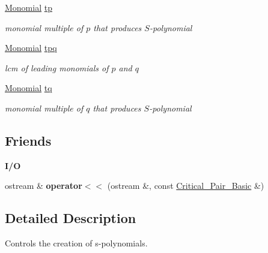 \begin{DoxyCompactItemize}
\mbox{\label{class_critical___pair___basic_a9b232e6359525154a6d7865e607964bb}} 
\hyperlink{class_monomial}{Monomial} \hyperlink{class_critical___pair___basic_a9b232e6359525154a6d7865e607964bb}{tp}
\begin{DoxyCompactList}\small\item\em monomial multiple of $p$ that produces $S$-\/polynomial \end{DoxyCompactList}\item 
\mbox{\label{class_critical___pair___basic_a91d6dc4856d8fb137faf8ffe2b823ae8}} 
\hyperlink{class_monomial}{Monomial} \hyperlink{class_critical___pair___basic_a91d6dc4856d8fb137faf8ffe2b823ae8}{tpq}
\begin{DoxyCompactList}\small\item\em lcm of leading monomials of $p$ and $q$ \end{DoxyCompactList}\item 
\mbox{\label{class_critical___pair___basic_a7e67ffb4af6c13830c95253e464bc3a3}} 
\hyperlink{class_monomial}{Monomial} \hyperlink{class_critical___pair___basic_a7e67ffb4af6c13830c95253e464bc3a3}{tq}
\begin{DoxyCompactList}\small\item\em monomial multiple of $q$ that produces $S$-\/polynomial \end{DoxyCompactList}\end{DoxyCompactItemize}
\subsection*{Friends}
\begin{Indent}\textbf{ I/O}\par
\begin{DoxyCompactItemize}
\item 
\mbox{\label{class_critical___pair___basic_a142698d76b6358faf451f21bf929c993}} 
ostream \& {\bfseries operator$<$$<$} (ostream \&, const \hyperlink{class_critical___pair___basic}{Critical\+\_\+\+Pair\+\_\+\+Basic} \&)
\end{DoxyCompactItemize}
\end{Indent}


\subsection{Detailed Description}
Controls the creation of s-\/polynomials. 

